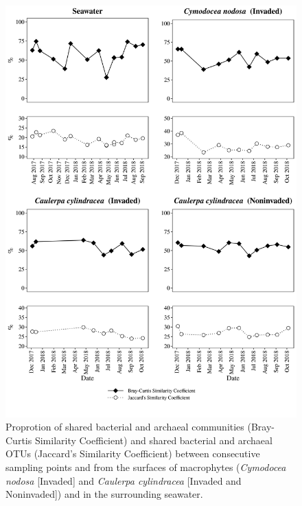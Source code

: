 \documentclass[12pt,]{article}
\begin{document}
\begin{figure}[H]

{\centering \includegraphics[width=0.85\linewidth]{../results/figures/seasonal_shared} 

}

\caption{Proprotion of shared bacterial and archaeal communities (Bray-Curtis Similarity Coefficient) and shared bacterial and archaeal OTUs (Jaccard's Similarity Coefficient) between consecutive sampling points and from the surfaces of macrophytes (\textit{Cymodocea nodosa} [Invaded] and \textit{Caulerpa cylindracea} [Invaded and Noninvaded]) and in the surrounding seawater.\label{shared}}\label{fig:unnamed-chunk-2}
\end{figure}
\end{document}
